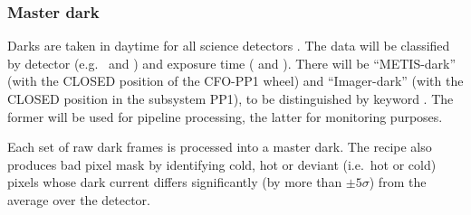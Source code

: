 \newpage
\subsubsection{Master dark}
\label{sssec:metis_det_dark}

Darks are taken in daytime for all science detectors
\cite{METIS-calibration_plan}. The data will be classified by detector
(e.g.~ and ) and exposure time
( and ). There will be ``METIS-dark''
(with the CLOSED position of the CFO-PP1 wheel) and ``Imager-dark''
(with the CLOSED position in the subsystem PP1), to be distinguished
by keyword \TBD. The former will be used for pipeline processing, the
latter for monitoring purposes.

Each set of raw dark frames is processed into a master dark. The
recipe also produces bad pixel mask by identifying cold, hot or
deviant (i.e.~hot or cold) pixels whose dark current differs
significantly (by more than $\pm 5\sigma$) from the average over the
detector.

